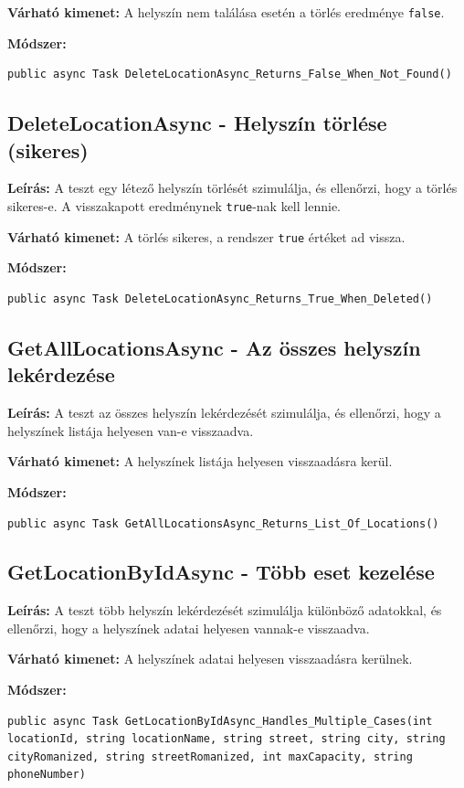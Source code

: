 \documentclass{report}[11pt]
\begin{document}
\textbf{Várható kimenet:} A helyszín nem találása esetén a törlés eredménye \texttt{false}.

\textbf{Módszer:} 
\begin{lstlisting}
public async Task DeleteLocationAsync_Returns_False_When_Not_Found()
\end{lstlisting}

\subsection{DeleteLocationAsync - Helyszín törlése (sikeres)}
\textbf{Leírás:} A teszt egy létező helyszín törlését szimulálja, és ellenőrzi, hogy a törlés sikeres-e. A visszakapott eredménynek \texttt{true}-nak kell lennie.

\textbf{Várható kimenet:} A törlés sikeres, a rendszer \texttt{true} értéket ad vissza.

\textbf{Módszer:} 
\begin{lstlisting}
public async Task DeleteLocationAsync_Returns_True_When_Deleted()
\end{lstlisting}

\subsection{GetAllLocationsAsync - Az összes helyszín lekérdezése}
\textbf{Leírás:} A teszt az összes helyszín lekérdezését szimulálja, és ellenőrzi, hogy a helyszínek listája helyesen van-e visszaadva.

\textbf{Várható kimenet:} A helyszínek listája helyesen visszaadásra kerül.

\textbf{Módszer:} 
\begin{lstlisting}
public async Task GetAllLocationsAsync_Returns_List_Of_Locations()
\end{lstlisting}

\subsection{GetLocationByIdAsync - Több eset kezelése}
\textbf{Leírás:} A teszt több helyszín lekérdezését szimulálja különböző adatokkal, és ellenőrzi, hogy a helyszínek adatai helyesen vannak-e visszaadva.

\textbf{Várható kimenet:} A helyszínek adatai helyesen visszaadásra kerülnek.

\textbf{Módszer:} 
\begin{lstlisting}
public async Task GetLocationByIdAsync_Handles_Multiple_Cases(int locationId, string locationName, string street, string city, string cityRomanized, string streetRomanized, int maxCapacity, string phoneNumber)
\end{lstlisting}
\end{document}
